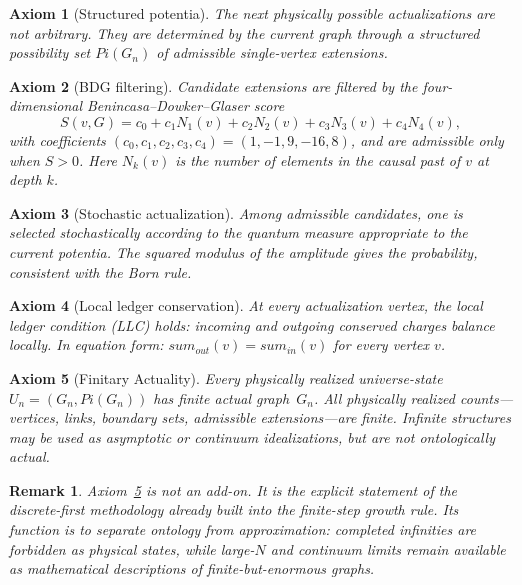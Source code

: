 \documentclass[11pt]{article}
\def\Pi{Pi}%
\def\mathrm#1{#1}%
\def\sum{sum}%
\newtheorem{axiom}{Axiom}
\newtheorem{remark}{Remark}
\newcommand{\Pot}{\Pi}
\begin{document}
\begin{axiom}[Structured potentia]
\label{ax:potentia}
The next physically possible actualizations are not arbitrary. They are determined by the current graph through a structured possibility set $\Pot(G_n)$ of admissible single-vertex extensions.
\end{axiom}

\begin{axiom}[BDG filtering]
\label{ax:bdg}
Candidate extensions are filtered by the four-dimensional Benincasa--Dowker--Glaser score
\begin{equation}
\label{eq:bdg}
S(v,G)=c_0 + c_1 N_1(v)+c_2 N_2(v)+c_3 N_3(v)+c_4 N_4(v),
\end{equation}
with coefficients $(c_0,c_1,c_2,c_3,c_4)=(1,-1,9,-16,8)$, and are admissible only when $S>0$. Here $N_k(v)$ is the number of elements in the causal past of $v$ at depth $k$.
\end{axiom}

\begin{axiom}[Stochastic actualization]
\label{ax:stochastic}
Among admissible candidates, one is selected stochastically according to the quantum measure appropriate to the current potentia. The squared modulus of the amplitude gives the probability, consistent with the Born rule.
\end{axiom}

\begin{axiom}[Local ledger conservation]
\label{ax:llc}
At every actualization vertex, the local ledger condition (LLC) holds: incoming and outgoing conserved charges balance locally. In equation form: $\sum_{\mathrm{out}}(v)=\sum_{\mathrm{in}}(v)$ for every vertex $v$.
\end{axiom}

\begin{axiom}[Finitary Actuality]
\label{ax:finite}
Every physically realized universe-state $U_n=(G_n,\Pot(G_n))$ has finite actual graph~$G_n$. All physically realized counts---vertices, links, boundary sets, admissible extensions---are finite. Infinite structures may be used as asymptotic or continuum idealizations, but are not ontologically actual.
\end{axiom}

\begin{remark}
Axiom~\ref{ax:finite} is not an add-on. It is the explicit statement of the discrete-first methodology already built into the finite-step growth rule. Its function is to separate ontology from approximation: completed infinities are forbidden as physical states, while large-$N$ and continuum limits remain available as mathematical descriptions of finite-but-enormous graphs.
\end{remark}
\end{document}
